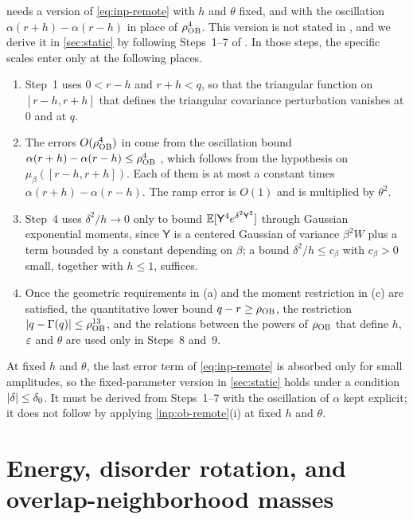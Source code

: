 \begin{remark}\label{rem:inp-remote-scales}
 needs a version of \eqref{eq:inp-remote} with $h$ and $\theta$
fixed, and with the oscillation $\alpha(r+h)-\alpha(r-h)$ in place of
$\rho_{\rm OB}^4$. This version is not stated in \cite{oai-barriers}, and we
derive it in \cref{sec:static} by following Steps~1--7 of
\cite[Section~7]{oai-barriers}. In those steps, the specific scales enter only
at the following places.
\begin{enumerate}[label=\textup{(\alph*)}]
\item Step~1 uses $0<r-h$ and $r+h<q$, so that the triangular function on
 $[r-h,r+h]$ that defines the triangular covariance perturbation vanishes at
 $0$ and at $q$.
\item The errors $O(\rho_{\rm OB}^4)$ in \cite[(7.14), (7.15), (7.20), (7.23)--(7.28)]{oai-barriers}
 come from the oscillation bound $\alpha(r+h)-\alpha(r-h)\le\rho_{\rm OB}^4$
 \cite[(7.6)]{oai-barriers}, which follows from the hypothesis on
 $\mu_\beta([r-h,r+h])$. Each of them is at most a constant times
 $\alpha(r+h)-\alpha(r-h)$. The ramp error is $O(1)$ and is multiplied by
 $\theta^2$.
\item Step~4 uses $\delta^2/h\to0$ only to bound
 $\mathbb E[\mathsf Y^4e^{\delta^2\mathsf Y^2}]$ through Gaussian exponential moments, since
 $\mathsf Y$ is a centered Gaussian of variance $\beta^2W$ plus a term bounded by
 a constant depending on $\beta$; a bound $\delta^2/h\le c_\beta$ with $c_\beta>0$
 small, together with $h\le1$, suffices.
\item Once the geometric requirements in (a) and the moment restriction in
 (c) are satisfied, the quantitative lower bound $q-r\ge\rho_{\rm OB}$, the
 restriction $\lvert q-\Gamma(q)\rvert\le\rho_{\rm OB}^{13}$, and the relations
 between the powers of $\rho_{\rm OB}$ that define $h$, $\varepsilon$ and $\theta$ are
 used only in Steps~8 and~9.
\end{enumerate}
At fixed $h$ and $\theta$, the last error term of \eqref{eq:inp-remote} is
absorbed only for small amplitudes, so the fixed-parameter version in
\cref{sec:static} holds under a condition $\lvert \delta\rvert\le\delta_0$. It must be
derived from Steps~1--7 with the oscillation of $\alpha$ kept explicit; it does
not follow by applying \cref{inp:ob-remote}(i) at fixed $h$ and $\theta$.
\end{remark}

\section{Energy, disorder rotation, and overlap-neighborhood masses}\label{sec:inp-coverage}

